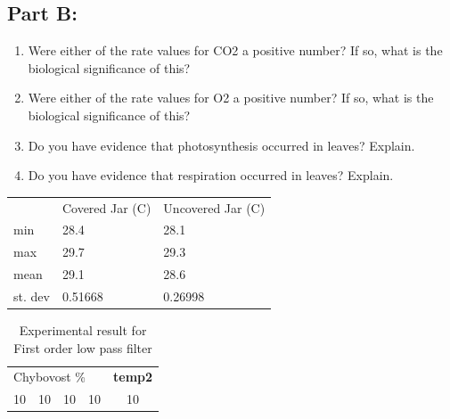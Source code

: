 \documentclass[a4paper, 12pt, english]{article}
\begin{document}
\subsection{Part B:}

\begin{enumerate}
    \item Were either of the rate values for CO2 a positive number? If so, what is the biological significance of this?
    \item Were either of the rate values for O2 a positive number? If so, what is the biological significance of this?
    \item Do you have evidence that photosynthesis occurred in leaves? Explain.
    \item Do you have evidence that respiration occurred in leaves? Explain.
\end{enumerate}


\begin{table}[]
	\begin{tabular}{lll}
		        & Covered Jar (\degree C) & Uncovered Jar (\degree C) \\
		min     & 28.4                    & 28.1                      \\
		max     & 29.7                    & 29.3                      \\
		mean    & 29.1                    & 28.6                      \\
		st. dev & 0.51668                 & 0.26998
	\end{tabular}
\end{table}
\begin{table}
	\caption[short]{\label{tab:Table 1} Experimental result for First order low pass filter}
	\centering
	\begin{tabular}{c c c c c}
		\toprule
		\multicolumn{4}{l|}{Chybovost \%} & \textbf{temp2}                \\
		\cmidrule[0.4pt](r{0.125em}){1-1}%
		\cmidrule[0.4pt](lr{0.125em}){2-2}%
		\cmidrule[0.4pt](lr{0.125em}){3-3}%
		\cmidrule[0.4pt](lr{0.125em}){4-4}%
		\cmidrule[0.4pt](lr{0.125em}){5-5}%
		10                                & 10             & 10 & 10 & 10

	\end{tabular}
\end{table}
\end{document}
